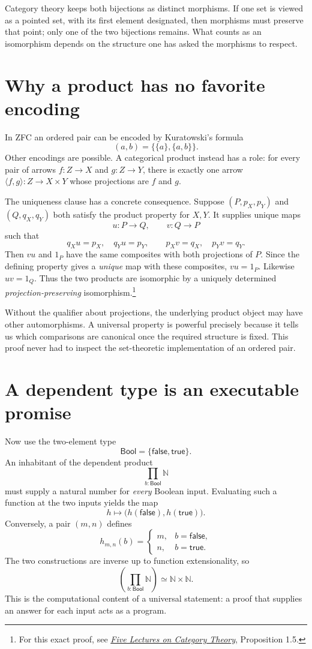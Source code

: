 Category theory keeps both bijections as distinct morphisms. If one set is viewed as a pointed set, with its first element designated, then morphisms must preserve that point; only one of the two bijections remains. What counts as an isomorphism depends on the structure one has asked the morphisms to respect.

\section{Why a product has no favorite encoding}

In ZFC an ordered pair can be encoded by Kuratowski's formula
\[
 (a,b)=\{\{a\},\{a,b\}\}.
\]
Other encodings are possible. A categorical product instead has a role: for every pair of arrows $f:Z\to X$ and $g:Z\to Y$, there is exactly one arrow $\langle f,g\rangle:Z\to X\times Y$ whose projections are $f$ and $g$.

The uniqueness clause has a concrete consequence. Suppose $(P,p_X,p_Y)$ and $(Q,q_X,q_Y)$ both satisfy the product property for $X,Y$. It supplies unique maps
\[
 u:P\to Q,\qquad v:Q\to P
\]
such that
\[
 q_Xu=p_X,\quad q_Yu=p_Y,\qquad
 p_Xv=q_X,\quad p_Yv=q_Y.
\]
Then $vu$ and $1_P$ have the same composites with both projections of $P$. Since the defining property gives a \emph{unique} map with these composites, $vu=1_P$. Likewise $uv=1_Q$. Thus the two products are isomorphic by a uniquely determined \emph{projection-preserving} isomorphism.\footnote{For this exact proof, see \href{https://web.math.ku.dk/~larsh/teaching/S2023_PM/categories.pdf}{\emph{Five Lectures on Category Theory}}, Proposition 1.5.}

Without the qualifier about projections, the underlying product object may have other automorphisms. A universal property is powerful precisely because it tells us which comparisons are canonical once the required structure is fixed. This proof never had to inspect the set-theoretic implementation of an ordered pair.

\section{A dependent type is an executable promise}

Now use the two-element type
\[
 \mathsf{Bool}=\{\mathsf{false},\mathsf{true}\}.
\]
An inhabitant of the dependent product
\[
 \prod_{b:\mathsf{Bool}}\mathbb N
\]
must supply a natural number for \emph{every} Boolean input. Evaluating such a function at the two inputs yields the map
\[
 h\longmapsto\bigl(h(\mathsf{false}),h(\mathsf{true})\bigr).
\]
Conversely, a pair $(m,n)$ defines
\[
 h_{m,n}(b)=
 \begin{cases}
 m,&b=\mathsf{false},\\
 n,&b=\mathsf{true}.
 \end{cases}
\]
The two constructions are inverse up to function extensionality, so
\[
 \boxed{\left(\prod_{b:\mathsf{Bool}}\mathbb N\right)
       \simeq\mathbb N\times\mathbb N.}
\]
This is the computational content of a universal statement: a proof that supplies an answer for each input acts as a program.

